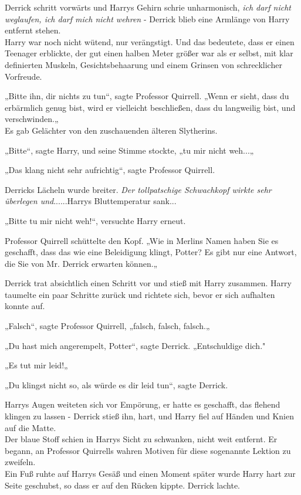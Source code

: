 {Derrick schritt vorwärts und Harrys Gehirn schrie unharmonisch, \emph{ich darf nicht weglaufen, ich darf mich nicht wehren} - Derrick blieb eine Armlänge von Harry entfernt stehen.\\ Harry war noch nicht wütend, nur verängstigt. Und das bedeutete, dass er einen Teenager erblickte, der gut einen halben Meter größer war als er selbst, mit klar definierten Muskeln, Gesichtsbehaarung und einem Grinsen von schrecklicher Vorfreude.

„Bitte ihn, dir nichts zu tun“, sagte Professor Quirrell. „Wenn er sieht, dass du erbärmlich genug bist, wird er vielleicht beschließen, dass du langweilig bist, und verschwinden.„\\ Es gab Gelächter von den zuschauenden älteren Slytherins.

„Bitte“, sagte Harry, und seine Stimme stockte, „tu mir nicht weh...„

„Das klang nicht sehr aufrichtig“, sagte Professor Quirrell.

Derricks Lächeln wurde breiter. \emph{Der tollpatschige Schwachkopf wirkte sehr überlegen und}......Harrys Bluttemperatur sank...

„Bitte tu mir nicht weh!“, versuchte Harry erneut.

Professor Quirrell schüttelte den Kopf. „Wie in Merlins Namen haben Sie es geschafft, dass das wie eine Beleidigung klingt, Potter? Es gibt nur eine Antwort, die Sie von Mr. Derrick erwarten können.„

Derrick trat absichtlich einen Schritt vor und stieß mit Harry zusammen. Harry taumelte ein paar Schritte zurück und richtete sich, bevor er sich aufhalten konnte auf.

„Falsch“, sagte Professor Quirrell, „falsch, falsch, falsch.„

„Du hast mich angerempelt, Potter“, sagte Derrick. „Entschuldige dich."

„Es tut mir leid!„

„Du klingst nicht so, als würde es dir leid tun“, sagte Derrick.

Harrys Augen weiteten sich vor Empörung, er hatte es geschafft, das flehend klingen zu lassen - Derrick stieß ihn, hart, und Harry fiel auf Händen und Knien auf die Matte.\\ Der blaue Stoff schien in Harrys Sicht zu schwanken, nicht weit entfernt. Er begann, an Professor Quirrells wahren Motiven für diese sogenannte Lektion zu zweifeln.\\ Ein Fuß ruhte auf Harrys Gesäß und einen Moment später wurde Harry hart zur Seite geschubst, so dass er auf den Rücken kippte. Derrick lachte.

}
